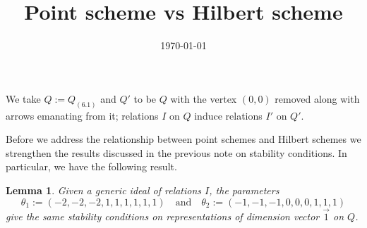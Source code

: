 \documentclass{amsart}
\title{Point scheme vs Hilbert scheme}
\date{\today}
\newtheorem{lem}[thm]{Lemma}
\theoremstyle{definition}
\begin{document}
\maketitle

We take $Q:= Q_{(6.1)}$ and $Q'$ to be $Q$ with the vertex $(0,0)$ removed along with arrows emanating from it; relations $I$ on $Q$ induce relations $I'$ on $Q'$.

Before we address the relationship between point schemes and Hilbert schemes we strengthen the results discussed in the previous note on stability conditions.
In particular, we have the following result.

\begin{lem}
Given a generic ideal of relations $I$, the parameters $$\theta_1:= (-2,-2,-2,1,1,1,1,1,1) \quad \text{and} \quad \theta_2:= (-1,-1,-1,0,0,0,1,1,1)$$ give the same stability conditions on representations of dimension vector $\vec{1}$ on $Q$.
\end{lem}
\end{document}
